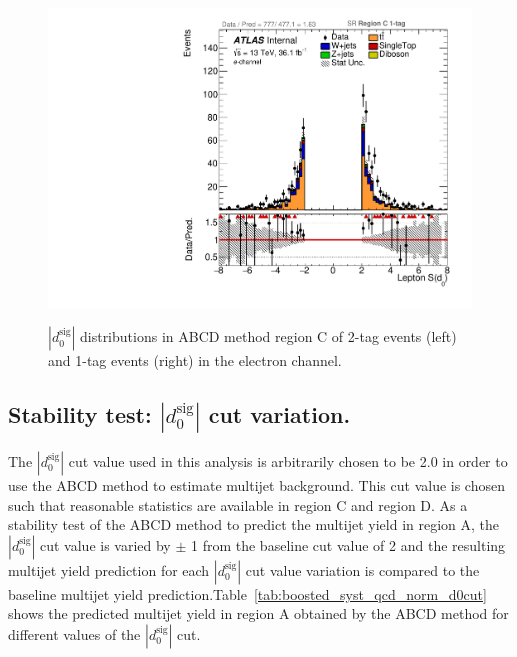 \begin{figure}[!htbp]
\begin{center}
\includegraphics[scale=0.33]{./figures/boosted/ABCD/elec_SR_RegionC_1tag_Lep_d0sigL}    \\
\caption{$|d_{0}^{\textrm{sig}}|$ distributions in ABCD method region C of 2-tag events (left) and 1-tag events (right) in the electron channel.}
\label{fig:boosted_abcd_region_c_SR_elec_d0}
\end{center}
\end{figure}


\FloatBarrier
%
%
\subsection{Stability test: $|d_{0}^{\textrm{sig}}|$ cut variation.}
\label{app:boosted_qcd_d0variation}
The $|d_{0}^{\textrm{sig}}|$ cut value used in this analysis
is arbitrarily chosen to be 2.0 in order to use the ABCD method to estimate multijet background.
This cut value is chosen such that reasonable statistics are available in region C and region D.
As a stability test of the ABCD method to predict the multijet yield in region A,
the $|d_{0}^{\textrm{sig}}|$ cut value is varied by $\pm$ 1 from the baseline cut value of 2 
and the resulting multijet yield prediction for each $|d_{0}^{\textrm{sig}}|$ cut value variation
is compared to the baseline multijet yield prediction.Table~\ref{tab:boosted_syst_qcd_norm_d0cut} 
shows the predicted multijet yield in region A obtained by the ABCD method for different values of 
the $|d_{0}^{\textrm{sig}}|$ cut. 

